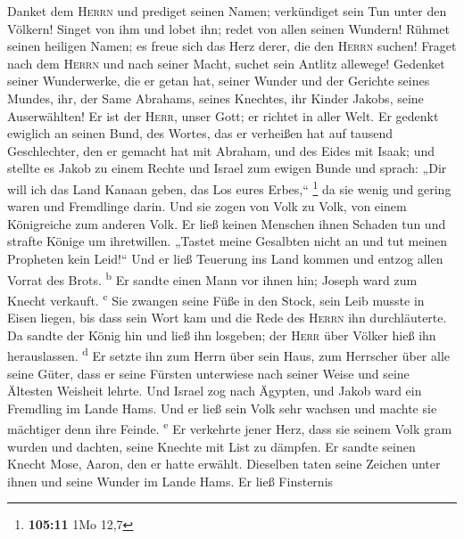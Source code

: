  Danket dem \textsc{Herrn} und prediget seinen Namen;
verkündiget sein Tun unter den Völkern!  Singet von ihm
und lobet ihn; redet von allen seinen Wundern!  Rühmet
seinen heiligen Namen; es freue sich das Herz derer, die den
\textsc{Herrn} suchen!  Fraget nach dem \textsc{Herrn} und
nach seiner Macht, suchet sein Antlitz allewege!  Gedenket
seiner Wunderwerke, die er getan hat, seiner Wunder und der Gerichte
seines Mundes,  ihr, der Same Abrahams, seines Knechtes,
ihr Kinder Jakobs, seine Auserwählten!  Er ist der
\textsc{Herr}, unser Gott; er richtet in aller Welt.  Er
gedenkt ewiglich an seinen Bund, des Wortes, das er verheißen hat auf
tausend Geschlechter,  den er gemacht hat mit Abraham, und
des Eides mit Isaak;  und stellte es Jakob zu einem
Rechte und Israel zum ewigen Bunde  und sprach: „Dir will
ich das Land Kanaan geben, das Los eures Erbes,`` \footnote{\textbf{105:11}
  1Mo 12,7}  da sie wenig und gering waren und Fremdlinge
darin.  Und sie zogen von Volk zu Volk, von einem
Königreiche zum anderen Volk.  Er ließ keinen Menschen
ihnen Schaden tun und strafte Könige um ihretwillen. 
„Tastet meine Gesalbten nicht an und tut meinen Propheten kein Leid!{}``
 Und er ließ Teuerung ins Land kommen und entzog allen
Vorrat des Brots. \textsuperscript{b}  Er sandte einen
Mann vor ihnen hin; Joseph ward zum Knecht verkauft. \textsuperscript{c}
 Sie zwangen seine Füße in den Stock, sein Leib musste in
Eisen liegen,  bis dass sein Wort kam und die Rede des
\textsc{Herrn} ihn durchläuterte.  Da sandte der König
hin und ließ ihn losgeben; der \textsc{Herr} über Völker hieß ihn
herauslassen. \textsuperscript{d}  Er setzte ihn zum
Herrn über sein Haus, zum Herrscher über alle seine Güter,
 dass er seine Fürsten unterwiese nach seiner Weise und
seine Ältesten Weisheit lehrte.  Und Israel zog nach
Ägypten, und Jakob ward ein Fremdling im Lande Hams.  Und
er ließ sein Volk sehr wachsen und machte sie mächtiger denn ihre
Feinde. \textsuperscript{e}  Er verkehrte jener Herz,
dass sie seinem Volk gram wurden und dachten, seine Knechte mit List zu
dämpfen.  Er sandte seinen Knecht Mose, Aaron, den er
hatte erwählt.  Dieselben taten seine Zeichen unter ihnen
und seine Wunder im Lande Hams.  Er ließ Finsternis
